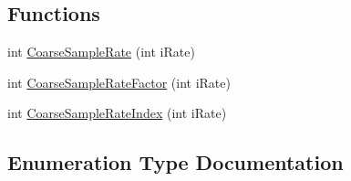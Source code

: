 \subsection*{Functions}
\begin{DoxyCompactItemize}
\item 
int \hyperlink{a00291_ab463c18c13ba2c75b89da6c90f02d0f0}{Coarse\+Sample\+Rate} (int i\+Rate)
\item 
int \hyperlink{a00291_a781f007f979a98d27156a4675fd853fa}{Coarse\+Sample\+Rate\+Factor} (int i\+Rate)
\item 
int \hyperlink{a00291_a149fe437454807a2d3edacf8de72c2a1}{Coarse\+Sample\+Rate\+Index} (int i\+Rate)
\end{DoxyCompactItemize}


\subsection{Enumeration Type Documentation}
\hypertarget{a00291_a65f189058b3204334c2c13d368d8ce3e}{}
